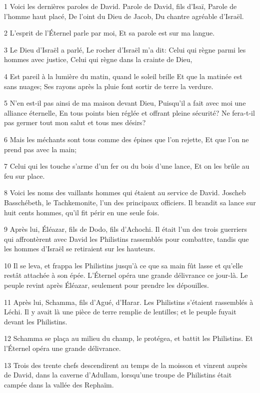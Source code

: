 \par 1 Voici les dernières paroles de David. Parole de David, fils d'Isaï, Parole de l'homme haut placé, De l'oint du Dieu de Jacob, Du chantre agréable d'Israël.
\par 2 L'esprit de l'Éternel parle par moi, Et sa parole est sur ma langue.
\par 3 Le Dieu d'Israël a parlé, Le rocher d'Israël m'a dit: Celui qui règne parmi les hommes avec justice, Celui qui règne dans la crainte de Dieu,
\par 4 Est pareil à la lumière du matin, quand le soleil brille Et que la matinée est sans nuages; Ses rayons après la pluie font sortir de terre la verdure.
\par 5 N'en est-il pas ainsi de ma maison devant Dieu, Puisqu'il a fait avec moi une alliance éternelle, En tous points bien réglée et offrant pleine sécurité? Ne fera-t-il pas germer tout mon salut et tous mes désirs?
\par 6 Mais les méchants sont tous comme des épines que l'on rejette, Et que l'on ne prend pas avec la main;
\par 7 Celui qui les touche s'arme d'un fer ou du bois d'une lance, Et on les brûle au feu sur place.
\par 8 Voici les noms des vaillants hommes qui étaient au service de David. Joscheb Basschébeth, le Tachkemonite, l'un des principaux officiers. Il brandit sa lance sur huit cents hommes, qu'il fit périr en une seule fois.
\par 9 Après lui, Éléazar, fils de Dodo, fils d'Achochi. Il était l'un des trois guerriers qui affrontèrent avec David les Philistins rassemblés pour combattre, tandis que les hommes d'Israël se retiraient sur les hauteurs.
\par 10 Il se leva, et frappa les Philistins jusqu'à ce que sa main fût lasse et qu'elle restât attachée à son épée. L'Éternel opéra une grande délivrance ce jour-là. Le peuple revint après Éléazar, seulement pour prendre les dépouilles.
\par 11 Après lui, Schamma, fils d'Agué, d'Harar. Les Philistins s'étaient rassemblés à Léchi. Il y avait là une pièce de terre remplie de lentilles; et le peuple fuyait devant les Philistins.
\par 12 Schamma se plaça au milieu du champ, le protégea, et battit les Philistins. Et l'Éternel opéra une grande délivrance.
\par 13 Trois des trente chefs descendirent au temps de la moisson et vinrent auprès de David, dans la caverne d'Adullam, lorsqu'une troupe de Philistins était campée dans la vallée des Rephaïm.

